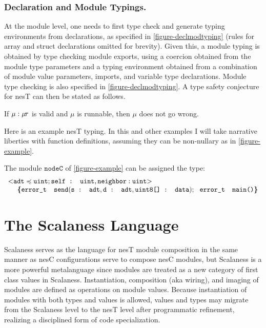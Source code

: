 \subsubsection{Declaration and Module Typings.}
At the module level, one needs to first type check and generate typing environments from
declarations, as specified in \autoref{figure-declmodtyping} (rules for array and struct
declarations omitted for brevity). Given this, a module typing is obtained by type checking
module exports, using a coercion obtained from the module type parameters and a typing
environment obtained from a combination of module value parameters, imports, and variable type
declarations. Module type checking is also specified in \autoref{figure-declmodtyping}. A type
safety conjecture for nesT can then be stated as follows.

\begin{conject}
  If $\mu : \mu\!\tau$ is valid and $\mu$ is runnable, then $\mu$ does not go wrong.
\end{conject}
Here is an example nesT typing. In this and other examples I will take narrative liberties with
function definitions, assuming they can be non-nullary as in \autoref{figure-example}.
\begin{example}
\label{example-nesttyping}
The module $\texttt{nodeC}$ of \autoref{figure-example} can be assigned the type:
$$
\begin{array}{l}
\margs{\tt{adt} \subtype \tt{uint}; \texttt{self : uint}, \tt{neighbor : uint}}\\
\ \ \ \ \lc
\texttt{error\_t\ \ send}(\texttt{s : adt}, \texttt{d : adt}, \texttt{uint8[] : data});\ \ 
\texttt{error\_t\ \  main()} 
\rc
\end{array}
$$
\end{example}


\section{The Scalaness Language}
\label{section-scalaness-theory}

Scalaness serves as the language for nesT module composition in the same manner as nesC
configurations serve to compose nesC modules, but Scalaness is a more powerful metalanguage
since modules are treated as a new category of first class values in Scalaness. Instantiation,
composition (aka wiring), and imaging of modules are defined as operations on module values.
Because instantiation of modules with both types and values is allowed, values and types may
migrate from the Scalaness level to the nesT level after programmatic refinement, realizing a
disciplined form of code specialization.

